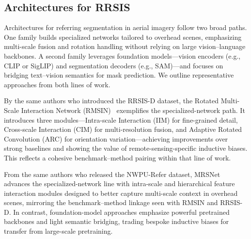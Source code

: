 \subsection{Architectures for RRSIS}

Architectures for referring segmentation in aerial imagery follow two broad paths. One family builds specialized networks tailored to overhead scenes, emphasizing multi-scale fusion and rotation handling without relying on large vision–language backbones. A second family leverages foundation models—vision encoders (e.g., CLIP or SigLIP) and segmentation decoders (e.g., SAM)—and focuses on bridging text–vision semantics for mask prediction. We outline representative approaches from both lines of work.

By the same authors who introduced the RRSIS-D dataset, the Rotated Multi-Scale Interaction Network (RMSIN)~\cite{liu2024rotated} exemplifies the specialized-network path. It introduces three modules—Intra-scale Interaction (IIM) for fine-grained detail, Cross-scale Interaction (CIM) for multi-resolution fusion, and Adaptive Rotated Convolution (ARC) for orientation variation—achieving improvements over strong baselines and showing the value of remote-sensing-specific inductive biases. This reflects a cohesive benchmark–method pairing within that line of work.

From the same authors who released the NWPU-Refer dataset, MRSNet~\cite{yang2024large} advances the specialized-network line with intra-scale and hierarchical feature interaction modules designed to better capture multi-scale context in overhead scenes, mirroring the benchmark–method linkage seen with RMSIN and RRSIS-D. In contrast, foundation-model approaches emphasize powerful pretrained backbones and light semantic bridging, trading bespoke inductive biases for transfer from large-scale pretraining.

